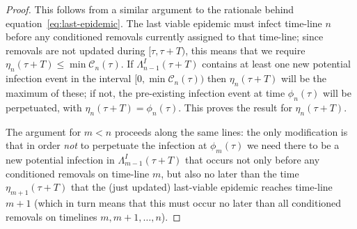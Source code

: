 \documentclass[]{article}
\newcommand{\Conditioned}{\mathcal{C}}
\begin{document}
\begin{proof}
	This follows from a similar argument to the rationale behind equation~\eqref{eq:last-epidemic}. The last viable epidemic must infect time-line \(n\) before any conditioned removals currently assigned to that time-line; since removals are not updated during \([\tau,\tau+T)\), this means that we require \(\eta_n(\tau+T)\le \min\Conditioned_n(\tau)\). If \(\Lambda_{n-1}^I(\tau+T)\) contains at least one new potential infection event in the interval \([0, \min\Conditioned_n(\tau)) \) then \(\eta_n(\tau+T)\) will be the maximum of these; if not, the pre-existing infection event at time \(\phi_n(\tau)\) will be perpetuated, with \(\eta_n(\tau+T) = \phi_n(\tau)\). This proves the result for \(\eta_n(\tau+T)\).
	
	The argument for \(m< n\) proceeds along the same lines: the only modification is that in order \emph{not} to perpetuate the infection at \(\phi_m(\tau)\) we need there to be a new potential infection in \(\Lambda^I_{m-1}(\tau+T)\) that occurs not only before any conditioned removals on time-line \(m\), but also no later than the time \(\eta_{m+1}(\tau+T)\) that the (just updated) last-viable epidemic reaches time-line \(m+1\) (which in turn means that this must occur no later than all conditioned removals on timelines \(m,m+1,\dots,n\)).
\end{proof}
\end{document}
